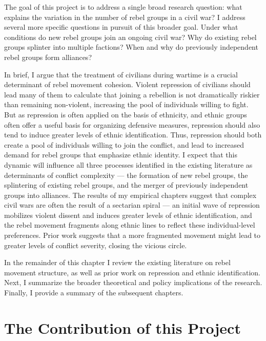 \documentclass[12pt,]{book}
\theoremstyle{definition}
\theoremstyle{definition}
\theoremstyle{remark}
\begin{document}
The goal of this project is to address a single broad research question:
what explains the variation in the number of rebel groups in a civil
war? I address several more specific questions in pursuit of this
broader goal. Under what conditions do new rebel groups join an ongoing
civil war? Why do existing rebel groups splinter into multiple factions?
When and why do previously independent rebel groups form alliances?

In brief, I argue that the treatment of civilians during wartime is a
crucial determinant of rebel movement cohesion. Violent repression of
civilians should lead many of them to calculate that joining a rebellion
is not dramatically riskier than remaining non-violent, increasing the
pool of individuals willing to fight. But as repression is often applied
on the basis of ethnicity, and ethnic groups often offer a useful basis
for organizing defensive measures, repression should also tend to induce
greater levels of ethnic identification. Thus, repression should both
create a pool of individuals willing to join the conflict, and lead to
increased demand for rebel groups that emphasize ethnic identity. I
expect that this dynamic will influence all three processes identified
in the existing literature as determinants of conflict complexity ---
the formation of new rebel groups, the splintering of existing rebel
groups, and the merger of previously independent groups into alliances.
The results of my empirical chapters suggest that complex civil wars are
often the result of a sectarian spiral --- an initial wave of repression
mobilizes violent dissent and induces greater levels of ethnic
identification, and the rebel movement fragments along ethnic lines to
reflect these individual-level preferences. Prior work suggests that a
more fragmented movement might lead to greater levels of conflict
severity, closing the vicious circle.

In the remainder of this chapter I review the existing literature on
rebel movement structure, as well as prior work on repression and ethnic
identification. Next, I summarize the broader theoretical and policy
implications of the research. Finally, I provide a summary of the
subsequent chapters.

\section{The Contribution of this
Project}\label{the-contribution-of-this-project}
\end{document}
